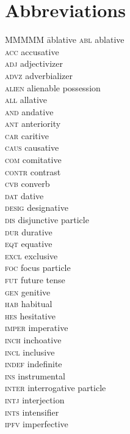 \documentclass[output=paper,colorlinks,citecolor=brown
\ChapterDOI{10.5281/zenodo.15697577}
]{langscibook}
\begin{document}
\section*{Abbreviations}
\begin{multicols}{2}
\begin{tabbing}
MMMMM \= ablative\kill
\textsc{abl} \> ablative\\
\textsc{acc} \> accusative\\
\textsc{adj} \> adjectivizer\\
\textsc{advz} \> adverbializer\\
\textsc{alien} \> alienable possession\\
\textsc{all} \> allative\\
\textsc{and} \> andative\\
\textsc{ant} \> anteriority\\
\textsc{car} \> caritive\\
\textsc{caus} \> causative\\
\textsc{com} \> comitative\\
\textsc{contr} \> contrast\\
\textsc{cvb} \> converb\\
\textsc{dat} \> dative\\
\textsc{desig} \> designative\\
\textsc{dis} \> disjunctive particle\\
\textsc{dur} \> durative\\
\textsc{eqt} \> equative\\
\textsc{excl} \> exclusive\\
\textsc{foc} \> focus particle\\
\textsc{fut} \> future tense\\
\textsc{gen} \> genitive\\
\textsc{hab} \> habitual\\
\textsc{hes} \> hesitative\\
\textsc{imper} \> imperative\\
\textsc{inch} \> inchoative\\
\textsc{incl} \> inclusive\\
\textsc{indef} \> indefinite\\
\textsc{ins} \> instrumental\\
\textsc{inter} \> interrogative particle\\
\textsc{intj} \> interjection\\
\textsc{ints} \> intensifier\\
\textsc{ipfv} \> imperfective\\

\end{tabbing}
\end{multicols}
\end{document}
